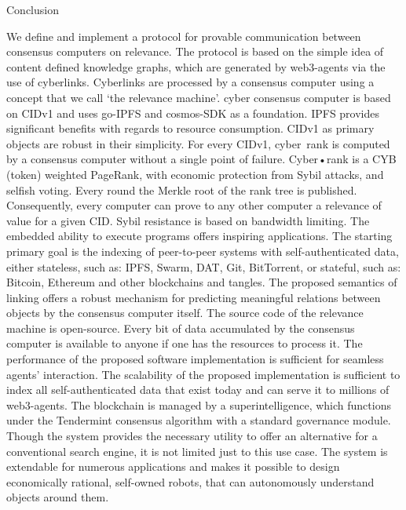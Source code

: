 \documentclass[8pt,oneside]{amsart}
\makeatletter
\renewcommand\subsection{\@startsection{subsection}
                                    {2}{\z@}
                                    {-3.25ex\@plus -1ex \@minus -.2ex}
                                    {0ex \@plus .2ex}
                                    {\play\Large}
                        }
\newcommand{\titleSection}[1]{\subsection{#1}}
\newcommand{\code}[1]{{\PlayBold #1}}
\makeatother
\begin{document}
\titleSection{Conclusion}\label{Conclusion}

We define and implement a protocol for provable communication between consensus computers on relevance. The protocol is based on the simple idea of content defined knowledge graphs, which are generated by web3-agents via the use of cyberlinks. Cyberlinks are processed by a consensus computer using a concept that we call ‘the relevance machine’. \code{cyber} consensus computer is based on \code{CIDv1} and uses \code{go-IPFS} and \code{cosmos-SDK} as a foundation. IPFS provides significant benefits with regards to resource consumption. CIDv1 as primary objects are robust in their simplicity. For every CIDv1, cyber~rank is computed by a consensus computer without a single point of failure. Cyber•rank is a CYB (token) weighted PageRank, with economic protection from Sybil attacks, and selfish voting. Every round the Merkle root of the rank tree is published. Consequently, every computer can prove to any other computer a relevance of value for a given CID. Sybil resistance is based on bandwidth limiting. The embedded ability to execute programs offers inspiring applications. The starting primary goal is the indexing of peer-to-peer systems with self-authenticated data, either stateless, such as: IPFS, Swarm, DAT, Git, BitTorrent, or stateful, such as: Bitcoin, Ethereum and other blockchains and tangles. The proposed semantics of linking offers a robust mechanism for predicting meaningful relations between objects by the consensus computer itself. The source code of the relevance machine is open-source. Every bit of data accumulated by the consensus computer is available to anyone if one has the resources to process it. The performance of the proposed software implementation is sufficient for seamless agents' interaction. The scalability of the proposed implementation is sufficient to index all self-authenticated data that exist today and can serve it to millions of web3-agents. The blockchain is managed by a superintelligence, which functions under the Tendermint consensus algorithm with a standard governance module. Though the system provides the necessary utility to offer an alternative for a conventional search engine, it is not limited just to this use case. The system is extendable for numerous applications and makes it possible to design economically rational, self-owned robots, that can autonomously understand objects around them.
\end{document}
